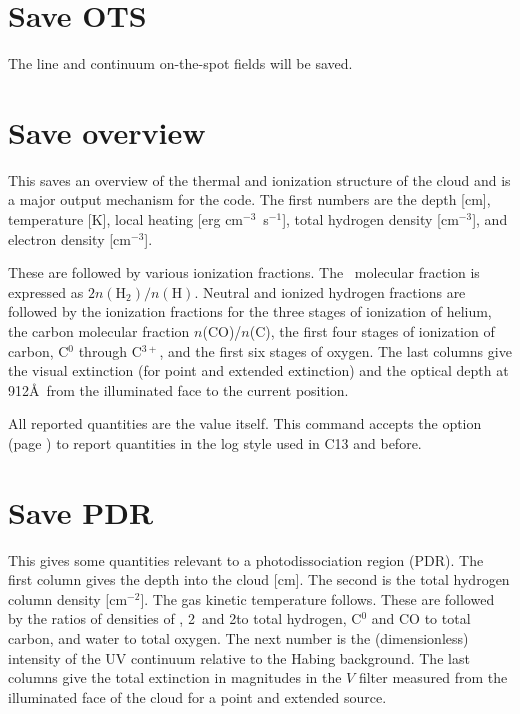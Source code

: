 \section{Save OTS}

The line and continuum on-the-spot fields will be saved.

\section{Save overview}

This saves an overview of the thermal and ionization structure
of the cloud and is a major output mechanism for the code.
The first numbers
are the depth [cm], temperature [K], local heating [erg cm$^{-3}$~s$^{-1}$], total
hydrogen density [cm$^{-3}$], and electron density [cm$^{-3}$].

These are followed by various ionization fractions.  
The \htwo\ molecular fraction is expressed as
$2n(\mathrm{H}_2)/n(\mathrm{H})$.
Neutral and ionized hydrogen fractions are followed by the ionization
fractions for the three stages of ionization of helium, the carbon molecular
fraction $n$(CO)/$n$(C), the first four stages of ionization of carbon, 
C$^0$ through C$^{3+}$, and
the first six stages of oxygen.  The last columns give the visual extinction
(for point and extended extinction) and the optical depth at 912\AA\ 
from the illuminated face to the current
position.

All reported quantities are the value itself.
This command accepts the  option 
(page \pageref{sec:SaveLogOption}) to report quantities in the
log style used in C13 and before. 

\section{Save PDR}

This gives some quantities relevant to a photodissociation region (PDR).
The first column gives the depth into the cloud [cm].  The second is the
total hydrogen column density [cm$^{-2}$].  The gas kinetic temperature follows.
These are followed by the ratios of densities of \hO, 2\htwo\ and 2\htwo* to total
hydrogen, C$^0$ and CO to total carbon, and water to total oxygen.  The next
number is the (dimensionless) intensity of the UV continuum relative to
the Habing background. The last columns give the total extinction in
magnitudes in the $V$ filter measured from the illuminated face
of the cloud for a point and extended source.


